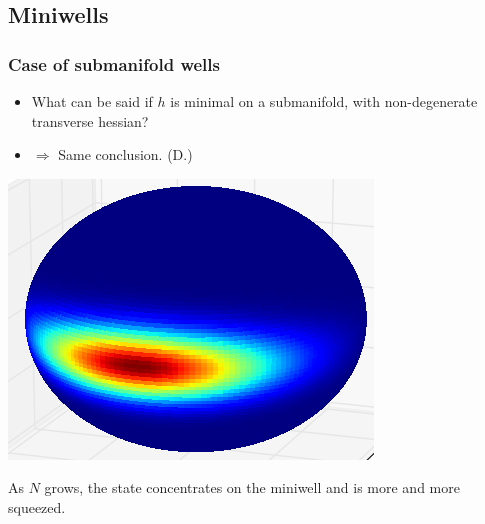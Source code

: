 \documentclass[mathserif]{beamer}
\begin{document}
\subsection{Miniwells}

\begin{frame}
  \frametitle{Case of submanifold wells}
  \begin{itemize}
\item What can be said if $h$ is minimal on a submanifold, with
  non-degenerate transverse hessian?
  \item $\Rightarrow$ Same conclusion. (D.)\end{itemize}
   \begin{minipage}[l]{0.3\linewidth}
\includegraphics[scale=0.3]{35.png}\end{minipage}\begin{minipage}[r]{0.65\linewidth}
As $N$ grows, the state concentrates on the miniwell and is more
and more squeezed.\end{minipage}
\end{frame}
\end{document}
